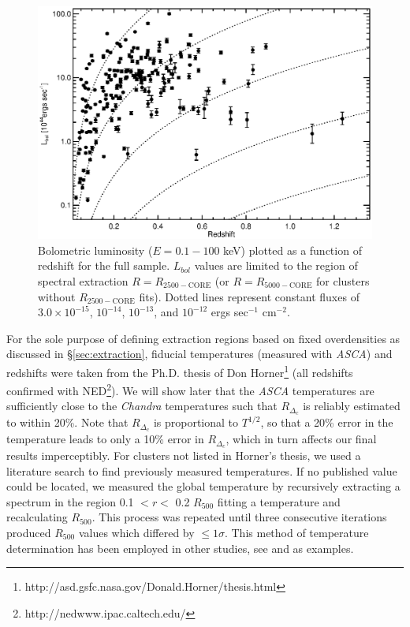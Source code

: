 \documentclass[12pt,preprint]{aastex}
\begin{document}
\clearpage
\begin{figure}
\begin{center}
\includegraphics*[width=\textwidth, trim=0mm 0mm 0mm 0mm, clip]{f1.eps}
\caption{
Bolometric luminosity ($E = 0.1-100$ keV) plotted as a function of
redshift for the full sample. $L_{bol}$ values are limited to the
region of spectral extraction $R=R_{2500-\mathrm{CORE}}$ (or
$R=R_{5000-\mathrm{CORE}}$ for clusters without $R_{2500-\mathrm{CORE}}$
fits). Dotted lines represent constant fluxes of $3.0\times10^{-15}$,
$10^{-14}$, $10^{-13}$, and $10^{-12}$ ergs sec$^{-1}$ cm$^{-2}$.
}
\label{fig:lx_z}
\end{center}
\end{figure}
\clearpage

For the sole purpose of defining extraction regions based on fixed
overdensities as discussed in \S\ref{sec:extraction}, fiducial
temperatures (measured with {\it ASCA}) and redshifts were taken from
the Ph.D. thesis of Don
Horner\footnote{http://asd.gsfc.nasa.gov/Donald.Horner/thesis.html}
(all redshifts confirmed with
NED\footnote{http://nedwww.ipac.caltech.edu/}). We will show later
that the {\it ASCA} temperatures are sufficiently close to the {\it
Chandra} temperatures such that $R_{\Delta_c}$ is reliably estimated
to within 20\%. Note that $R_{\Delta_c}$ is proportional to $T^{1/2}$,
so that a 20\% error in the temperature leads to only a 10\% error in
$R_{\Delta_c}$, which in turn affects our final results
imperceptibly. For clusters not listed in Horner's thesis, we used a
literature search to find previously measured temperatures. If no
published value could be located, we measured the global temperature
by recursively extracting a spectrum in the region 0.1 $< r <$ 0.2
$R_{500}$ fitting a temperature and recalculating $R_{500}$. This
process was repeated until three consecutive iterations produced
$R_{500}$ values which differed by $\leq 1\sigma$. This method of
temperature determination has been employed in other studies, see
\cite{2006MNRAS.tmp.1068S} and \cite{2006ApJS..162..304H} as
examples.
\end{document}
